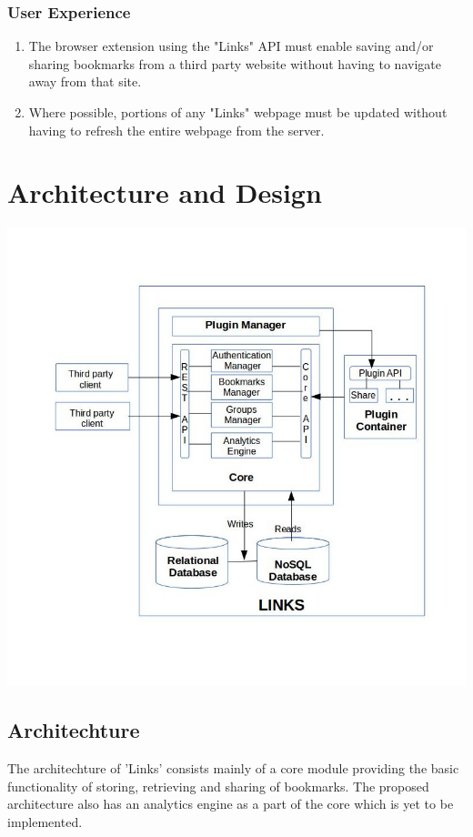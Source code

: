 \documentclass[11pt]{report} %
\begin{document}
\subsection{User Experience}
\begin{enumerate}
\item
The browser extension using the "Links" API  must enable saving and/or sharing bookmarks from a third party website without having to navigate away from that site.
\item
Where possible, portions of any "Links" webpage must be updated without having to refresh the entire webpage from the server.
\end{enumerate}


\chapter{Architecture and Design}

\includegraphics[scale=0.5]{architecture_diagram.jpg}
\section{Architechture}
The architechture of 'Links' consists mainly of a core module providing the basic functionality of storing, retrieving and sharing of bookmarks. The proposed architecture also has an analytics engine as a part of the core which is yet to be implemented.
\end{document}
